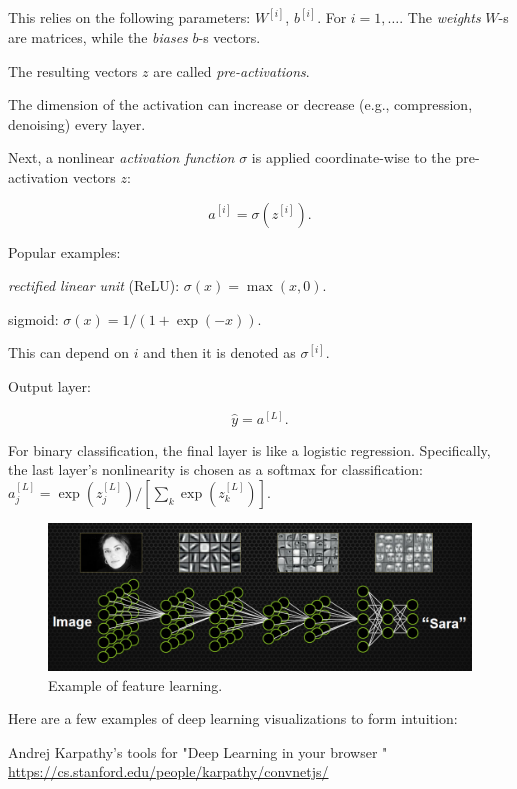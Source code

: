 \documentclass[english]{article}
\begin{document}
This relies on the following parameters: $W^{[i]}$, $b^{[i]}$. For $i=1,\ldots$. The \emph{weights} $W$-s are matrices, while the \emph{biases} $b$-s vectors.

The resulting vectors $z$ are called \emph{pre-activations}.

The dimension of the activation can increase or decrease (e.g., compression, denoising) every layer. 

\item 
Next, a nonlinear \emph{activation function} $\sigma$ is applied coordinate-wise to the pre-activation vectors $z$: 

$$a^{[i]} = \sigma(z^{[i]}).$$


Popular examples: 

\bitem 
\item \emph{rectified linear unit} (ReLU): $\sigma(x) = \max(x,0)$. 
\item sigmoid: $\sigma(x) = 1/(1+\exp(-x))$. 
\eitem 

This can depend on $i$ and then it is denoted as $\sigma^{[i]}$. 


\item Output layer: 

$$\hat y = a^{[L]}.$$

For binary classification, the final layer is like a logistic regression. Specifically, the last layer's nonlinearity is chosen as a softmax for classification: $a^{[L]}_j = \exp(z^{[L]}_j)/[\sum_k\exp(z^{[L]}_k)]$.


\eenum 


\eenum 


\begin{figure}
  \centering
  \includegraphics[scale=0.3]{nn_example.png}
  \caption{Example of feature learning.}
  \label{fl}
\end{figure}

\item Here are a few examples of deep learning visualizations to form intuition: 

Andrej Karpathy's tools for "Deep Learning in your browser
" \url{https://cs.stanford.edu/people/karpathy/convnetjs/}
\end{document}
